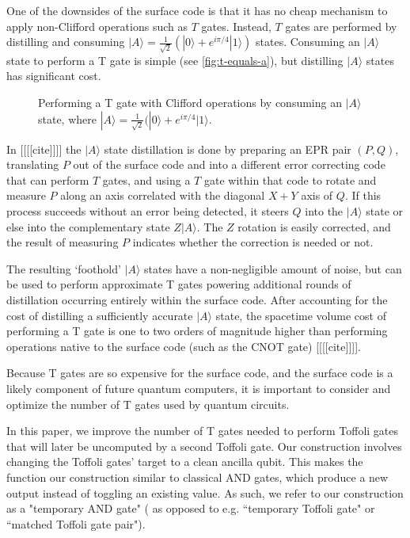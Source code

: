 \documentclass[twocolumn,longbibliography]{quantumarticle-customized}
\newcommand{\qS}{\gate{S}}
\begin{document}
One of the downsides of the surface code is that it has no cheap mechanism to apply non-Clifford operations such as $T$ gates.
Instead, $T$ gates are performed by distilling and consuming $|A\rangle = \frac{1}{\sqrt{2}} (|0\rangle + e^{i \pi/4} |1\rangle)$ states.
Consuming an $|A\rangle$ state to perform a T gate is simple (see \autoref{fig:t-equals-a}), but distilling $|A\rangle$ states has significant cost.

\begin{figure}
  \resizebox{\linewidth}{!}{
    \Qcircuit @R=0.7em @C=0.7em {
      &\gate{T}&\qw &&=&&&          &&\qw &\ctrl{1}&\qw    &\qS            &\qw &\\
      &        &    && &&&|A\rangle &&\qw &\targ   &\meter &\cw\cwx\bullet &    &\\
    }
  }
  \caption{
	Performing a T gate with Clifford operations by consuming an $|A\rangle$ state, where $|A\rangle = \frac{1}{\sqrt{2}} (|0\rangle + e^{i \pi/4} |1\rangle$.
  }
  \label{fig:t-equals-a}
\end{figure}

In [[[[cite]]]] the $|A\rangle$ state distillation is done by preparing an EPR pair $(P, Q)$, translating $P$ out of the surface code and into a different error correcting code that can perform $T$ gates, and using a $T$ gate within that code to rotate and measure $P$ along an axis correlated with the diagonal $X+Y$ axis of $Q$.
If this process succeeds without an error being detected, it steers \cite{Wiseman2007} $Q$ into the $|A\rangle$ state or else into the complementary state $Z|A\rangle$.
The $Z$ rotation is easily corrected, and the result of measuring $P$ indicates whether the correction is needed or not.

The resulting `foothold' $|A\rangle$ states have a non-negligible amount of noise, but can be used to perform approximate T gates powering additional rounds of distillation occurring entirely within the surface code.
After accounting for the cost of distilling a sufficiently accurate $|A\rangle$ state, the spacetime volume cost of performing a T gate is one to two orders of magnitude higher than performing operations native to the surface code (such as the CNOT gate) [[[[cite]]]].

Because T gates are so expensive for the surface code, and the surface code is a likely component of future quantum computers, it is important to consider and optimize the number of T gates used by quantum circuits.

In this paper, we improve the number of T gates needed to perform Toffoli gates that will later be uncomputed by a second Toffoli gate.
Our construction involves changing the Toffoli gates' target to a clean ancilla qubit.
This makes the function our construction similar to classical AND gates, which produce a new output instead of toggling an existing value.
As such, we refer to our construction as a "temporary AND gate" ( as opposed to e.g. ``temporary Toffoli gate" or ``matched Toffoli gate pair").
\end{document}
